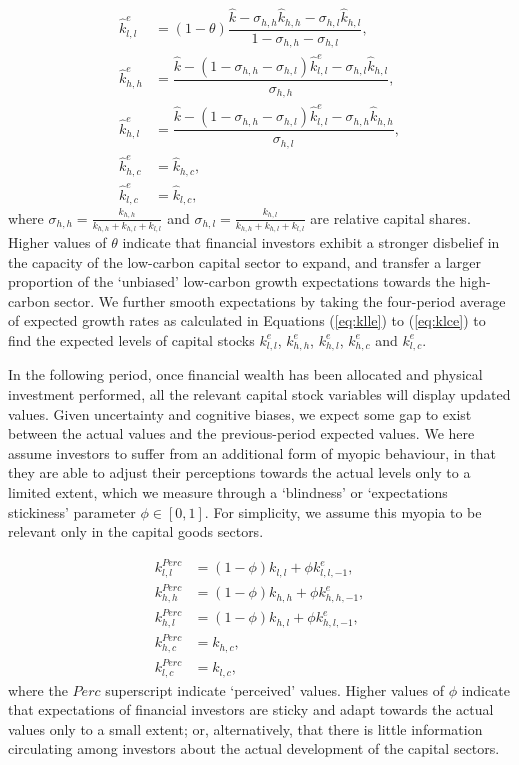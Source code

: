 \documentclass[authoryear]{article}
\begin{document}
\begin{align}
\hat{k}_{l,l}^e &= (1-\theta) \dfrac{\hat{k} - \sigma_{h,h} \hat{k}_{h,h} - \sigma_{h,l} \hat{k}_{h,l}}{1-\sigma_{h,h}- \sigma_{h,l}}, \label{eq:klle}\\
\hat{k}_{h,h}^e &= \dfrac{\hat{k}-(1- \sigma_{h,h}-\sigma_{h,l}) \hat{k}^e_{l,l} - \sigma_{h,l}\hat{k}_{h,l}}{\sigma_{h,h}}, \label{eq:khhe}\\
\hat{k}_{h,l}^e &= \dfrac{\hat{k}-(1- \sigma_{h,h}-\sigma_{h,l}) \hat{k}^e_{l,l} - \sigma_{h,h}\hat{k}_{h,h}}{\sigma_{h,l}}, \label{eq:khle}\\
\hat{k}_{h,c}^e &= \hat{k}_{h,c}, \label{eq:khce}\\
\hat{k}_{l,c}^e &= \hat{k}_{l,c}, \label{eq:klce}
\end{align}
where $\sigma_{h,h} = \frac{k_{h,h}}{k_{h,h} + k_{h,l} + k_{l,l}}$ and $\sigma_{h,l} = \frac{k_{h,l}}{k_{h,h} + k_{h,l} + k_{l,l}}$ are relative capital shares. Higher values of $\theta$ indicate that financial investors exhibit a stronger disbelief in the capacity of the low-carbon capital sector to expand, and transfer a larger proportion of the `unbiased' low-carbon growth expectations towards the high-carbon sector. We further smooth expectations by taking the four-period average of expected growth rates as calculated in Equations (\ref{eq:klle}) to (\ref{eq:klce}) to find the expected levels of capital stocks $k_{l,l}^e$, $k_{h,h}^e$, $k_{h,l}^e$, $k_{h,c}^e$ and $k_{l,c}^e$.

In the following period, once financial wealth has been allocated and physical investment performed,  all the relevant capital stock variables will display updated values. Given uncertainty and cognitive biases, we expect some gap to exist between the actual values and the previous-period expected values. We here assume investors to suffer from an additional form of myopic behaviour, in that they are able to adjust their perceptions towards the actual levels only to a limited extent, which we measure through a `blindness' or `expectations stickiness' parameter $\phi\in[0,1]$. For simplicity, we assume this myopia to be relevant only in the capital goods sectors. 

\begin{align}
k_{l,l}^{Perc} &=  (1-\phi) k_{l,l} + \phi k_{l,l,-1}^e,\\
k_{h,h}^{Perc} &=  (1-\phi) k_{h,h} + \phi k_{h,h,-1}^e,\\
k_{h,l}^{Perc} &=  (1-\phi) k_{h,l} + \phi k_{h,l,-1}^e,\\
k_{h,c}^{Perc} &=  k_{h,c},\\
k_{l,c}^{Perc} &=  k_{l,c},
\end{align}
where the $Perc$ superscript indicate `perceived' values. Higher values of $\phi$ indicate that expectations of financial investors are sticky and adapt towards the actual values only to a small extent; or, alternatively, that there is little information circulating among investors about the actual development of the capital sectors. 
\end{document}
